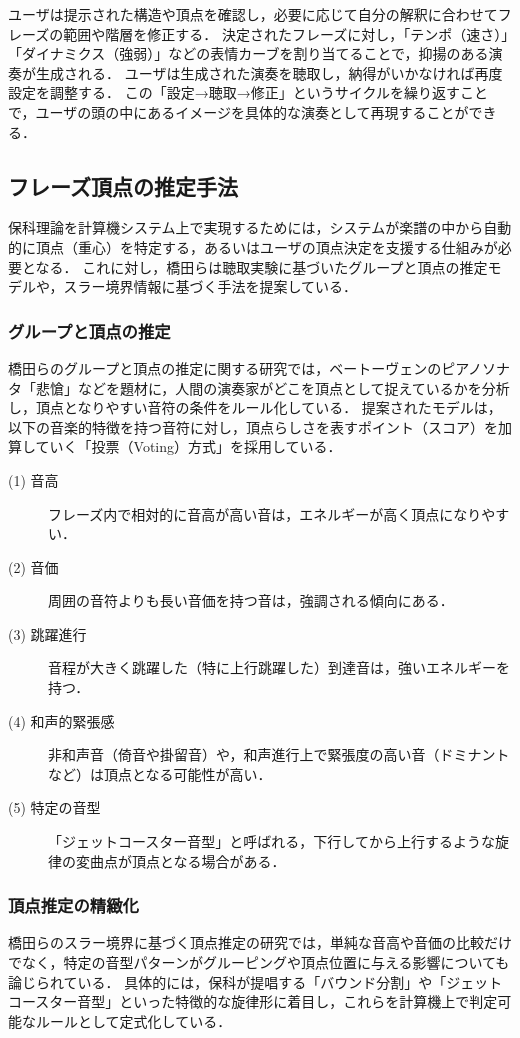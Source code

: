 ユーザは提示された構造や頂点を確認し，必要に応じて自分の解釈に合わせてフレーズの範囲や階層を修正する．
決定されたフレーズに対し，「テンポ（速さ）」「ダイナミクス（強弱）」などの表情カーブを割り当てることで，抑揚のある演奏が生成される．
ユーザは生成された演奏を聴取し，納得がいかなければ再度設定を調整する．
この「設定→聴取→修正」というサイクルを繰り返すことで，ユーザの頭の中にあるイメージを具体的な演奏として再現することができる．

\subsection{フレーズ頂点の推定手法}
保科理論を計算機システム上で実現するためには，システムが楽譜の中から自動的に頂点（重心）を特定する，あるいはユーザの頂点決定を支援する仕組みが必要となる．
これに対し，橋田らは聴取実験に基づいたグループと頂点の推定モデル\cite{Apex_group}や，スラー境界情報に基づく手法\cite{Apex_phrase}を提案している．

\subsubsection{グループと頂点の推定}
橋田らのグループと頂点の推定に関する研究\cite{Apex_group}では，ベートーヴェンのピアノソナタ「悲愴」などを題材に，人間の演奏家がどこを頂点として捉えているかを分析し，頂点となりやすい音符の条件をルール化している．
提案されたモデルは，以下の音楽的特徴を持つ音符に対し，頂点らしさを表すポイント（スコア）を加算していく「投票（Voting）方式」を採用している．

\begin{description}
	\item[(1) 音高]
	      フレーズ内で相対的に音高が高い音は，エネルギーが高く頂点になりやすい．
	\item[(2) 音価]
	      周囲の音符よりも長い音価を持つ音は，強調される傾向にある．
	\item[(3) 跳躍進行]
	      音程が大きく跳躍した（特に上行跳躍した）到達音は，強いエネルギーを持つ．
	\item[(4) 和声的緊張感]
	      非和声音（倚音や掛留音）や，和声進行上で緊張度の高い音（ドミナントなど）は頂点となる可能性が高い．
	\item[(5) 特定の音型]
	      「ジェットコースター音型」と呼ばれる，下行してから上行するような旋律の変曲点が頂点となる場合がある．
\end{description}

\subsubsection{頂点推定の精緻化}
橋田らのスラー境界に基づく頂点推定の研究\cite{Apex_phrase}では，単純な音高や音価の比較だけでなく，特定の音型パターンがグルーピングや頂点位置に与える影響についても論じられている．
具体的には，保科が提唱する「バウンド分割」や「ジェットコースター音型」といった特徴的な旋律形に着目し，これらを計算機上で判定可能なルールとして定式化している．

